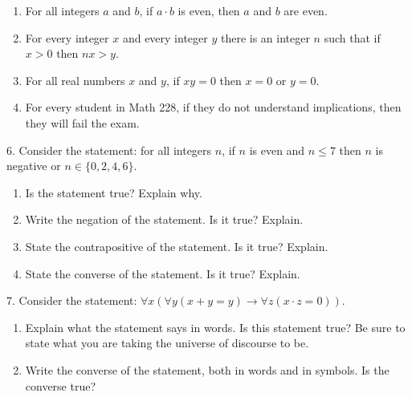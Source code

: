 \documentclass[10pt,]{book}
\theoremstyle{plain}
\theoremstyle{definition}
\theoremstyle{definition}
\theoremstyle{definition}
\numberwithin{equation}{chapter}
\def\imp{\rightarrow}
\begin{document}
\begin{exerciselist}
\begin{enumerate}[label=(\alph*)]
\item\hypertarget{li-1124}{}
                For all integers \(a\) and \(b\), if \(a\cdot b\) is even, then \(a\) and \(b\) are even.
\item\hypertarget{li-1125}{}
                For every integer \(x\) and every integer \(y\) there is an integer \(n\) such that if \(x > 0\) then \(nx > y\).
\item\hypertarget{li-1126}{}
                For all real numbers \(x\) and \(y\), if \(xy = 0\) then \(x = 0\) or \(y = 0\).
\item\hypertarget{li-1127}{}
                For every student in Math 228, if they do not understand implications, then they will fail the exam.
\end{enumerate}
\par\smallskip
\item[6.]\hypertarget{exercise-249}{}
            Consider the statement: for all integers \(n\), if \(n\) is even and \(n \le 7\) then \(n\) is negative or \(n \in \{0,2,4,6\}\).
\leavevmode%
\begin{enumerate}[label=(\alph*)]
\item\hypertarget{li-1137}{}
                Is the statement true? Explain why.
\item\hypertarget{li-1138}{}
                Write the negation of the statement. Is it true? Explain.
\item\hypertarget{li-1139}{}
                State the contrapositive of the statement. Is it true? Explain.
\item\hypertarget{li-1140}{}
                State the converse of the statement. Is it true? Explain.
\end{enumerate}
\par\smallskip
\item[7.]\hypertarget{exercise-250}{}
            Consider the statement: \(\forall x (\forall y (x + y = y) \imp \forall z (x\cdot z = 0))\).
\leavevmode%
\begin{enumerate}[label=(\alph*)]
\item\hypertarget{li-1145}{}
                Explain what the statement says in words. Is this statement true? Be sure to state what you are taking the universe of discourse to be.
\item\hypertarget{li-1146}{}
                Write the converse of the statement, both in words and in symbols. Is the converse true?

\end{enumerate}
\end{exerciselist}
\end{document}
